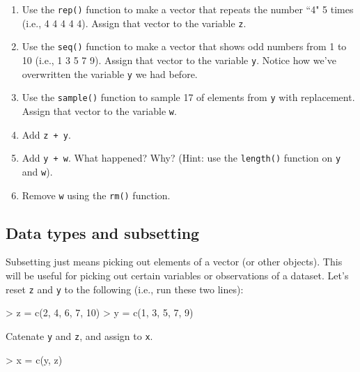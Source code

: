 \documentclass{exam}
\begin{document}
\begin{enumerate}
\item Use the \texttt{rep()} function to make a vector that repeats the number ``4" 5 times (i.e., 4 4 4 4 4). Assign that vector to the variable \texttt{z}.
\item Use the \texttt{seq()} function to make a vector that shows odd numbers from 1 to 10 (i.e., 1 3 5 7 9). Assign that vector to the variable \texttt{y}. Notice how we've overwritten the variable \texttt{y} we had before.
\item Use the \texttt{sample()} function to sample 17 of elements from \texttt{y} with replacement. Assign that vector to the variable \texttt{w}. 
\item Add \texttt{z + y}.
\item Add \texttt{y + w}. What happened? Why? (Hint: use the \texttt{length()} function on \texttt{y} and \texttt{w}).
\item Remove \texttt{w} using the \texttt{rm()} function.
\end{enumerate}

\begin{solution}
\end{solution}

\subsection{Data types and subsetting}

Subsetting just means picking out elements of a vector (or other objects). This will be useful for picking out certain variables or observations of a dataset. Let's reset \texttt{z} and \texttt{y} to the following (i.e., run these two lines):
\begin{Schunk}
\begin{Sinput}
> z = c(2, 4, 6, 7, 10)
> y = c(1, 3, 5, 7, 9)
\end{Sinput}
\end{Schunk}

\noindent Catenate \texttt{y} and \texttt{z}, and assign to \texttt{x}.
\begin{Schunk}
\begin{Sinput}
> x = c(y, z)  
\end{Sinput}
\end{Schunk}
\end{document}
